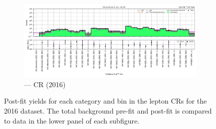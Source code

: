 \begin{figure}[htbp]
    \begin{subfigure}[b]{0.65\textwidth}
        \includegraphics[width=\textwidth]{chapters/higgstoinv/figures/mountain_ranges/2016/ttH/Zee_tree_fit_b-abs_values_ttH_cats.pdf}
        \caption{\ttH --- \doubleEleCr \gls{CR} (2016)}
    \end{subfigure}
    \caption[Post-fit yields for each \ttH category and \ptmiss bin in the lepton control regions for the 2016 dataset]{Post-fit yields for each \ttH category and \ptmiss bin in the lepton \glspl{CR} for the 2016 dataset. The total background pre-fit and post-fit is compared to data in the lower panel of each subfigure.}
    \label{fig:htoinv_mountain_range_ttH_2016_CRs}
\end{figure}


